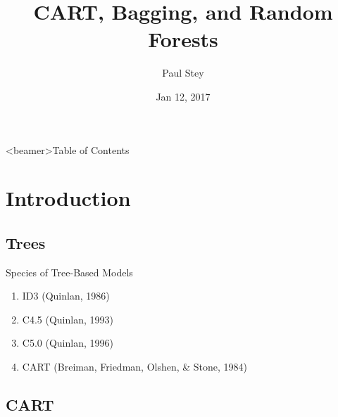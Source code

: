 \documentclass[pdf]{beamer}
\title[Random Forests]{CART, Bagging, and Random Forests}
\author{Paul Stey}
\date{Jan 12, 2017}
\begin{document}
\begin{frame}
\titlepage
\end{frame}



\begin{frame}<beamer>{Table of Contents}
	\tableofcontents[currentsection, 
				 currentsubsection, 
				 sectionstyle=show, 
				 subsectionstyle=show]
\end{frame}


\section{Introduction}
	\subsection{Trees}
		\begin{frame}{Species of Tree-Based Models}
			\begin{enumerate}
				\item ID3 (Quinlan, 1986)
				\item C4.5 (Quinlan, 1993)
				\item C5.0 (Quinlan, 1996)
				\item CART (Breiman, Friedman, Olshen, \& Stone, 1984)

			\end{enumerate}
		\end{frame}
			
	
		
		
	\subsection{CART}
	
\end{document}
